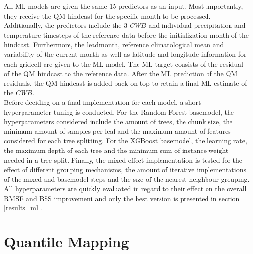 \documentclass[ba-lentz.tex]{subfile}
\begin{document}
All ML models are given the same 15 predictors as an input.
Most importantly, they receive the QM hindcast for the specific month to be processed.
Additionally, the predictors include the 3 $CWB$ and individual precipitation and temperature timesteps of the reference data before the initialization month of the hindcast.
Furthermore, the leadmonth, reference climatological mean and variability of the current month as well as latitude and longitude information for each gridcell are given to the ML model.
The ML target consists of the residual of the QM hindcast to the reference data.
After the ML prediction of the QM residuals, the QM hindcast is added back on top to retain a final ML estimate of the $CWB$. \\
Before deciding on a final implementation for each model, a short hyperparameter tuning is conducted.
For the Random Forest basemodel, the hyperparameters considered include the amount of trees, the chunk size, the minimum amount of samples per leaf and the maximum amount of features considered for each tree splitting.
For the XGBoost basemodel, the learning rate, the maximum depth of each tree and the minimum sum of instance weight needed in a tree split.
Finally, the mixed effect implementation is tested for the effect of different grouping mechanisms, the amount of iterative implementations of the mixed and basemodel steps and the size of the nearest neighbour grouping.
All hyperparameters are quickly evaluated in regard to their effect on the overall RMSE and BSS improvement and only the best version is presented in section \ref{results_ml}.


\section{Quantile Mapping}\label{results_qm}
\end{document}
